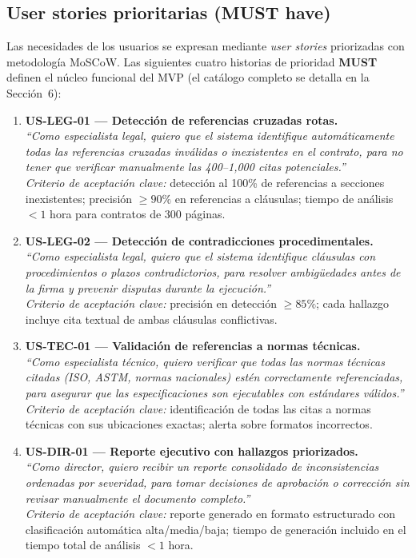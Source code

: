\subsection{User stories prioritarias (MUST have)}

Las necesidades de los usuarios se expresan mediante \textit{user stories}
priorizadas con metodología MoSCoW. Las siguientes cuatro historias de prioridad
\textbf{MUST} definen el núcleo funcional del MVP (el catálogo completo se
detalla en la Sección~6):

\begin{enumerate}
    \item \textbf{US-LEG-01 — Detección de referencias cruzadas rotas.}\\
    \textit{``Como especialista legal, quiero que el sistema identifique
    automáticamente todas las referencias cruzadas inválidas o inexistentes en el
    contrato, para no tener que verificar manualmente las 400--1{,}000 citas
    potenciales.''}\\
    \textit{Criterio de aceptación clave:} detección al 100\% de referencias a
    secciones inexistentes; precisión $\geq 90\%$ en referencias a cláusulas;
    tiempo de análisis $< 1$ hora para contratos de 300 páginas.

    \item \textbf{US-LEG-02 — Detección de contradicciones procedimentales.}\\
    \textit{``Como especialista legal, quiero que el sistema identifique cláusulas
    con procedimientos o plazos contradictorios, para resolver ambigüedades antes
    de la firma y prevenir disputas durante la ejecución.''}\\
    \textit{Criterio de aceptación clave:} precisión en detección $\geq 85\%$;
    cada hallazgo incluye cita textual de ambas cláusulas conflictivas.

    \item \textbf{US-TEC-01 — Validación de referencias a normas técnicas.}\\
    \textit{``Como especialista técnico, quiero verificar que todas las normas
    técnicas citadas (ISO, ASTM, normas nacionales) estén correctamente
    referenciadas, para asegurar que las especificaciones son ejecutables con
    estándares válidos.''}\\
    \textit{Criterio de aceptación clave:} identificación de todas las citas a
    normas técnicas con sus ubicaciones exactas; alerta sobre formatos incorrectos.

    \item \textbf{US-DIR-01 — Reporte ejecutivo con hallazgos priorizados.}\\
    \textit{``Como director, quiero recibir un reporte consolidado de inconsistencias
    ordenadas por severidad, para tomar decisiones de aprobación o corrección sin
    revisar manualmente el documento completo.''}\\
    \textit{Criterio de aceptación clave:} reporte generado en formato estructurado
    con clasificación automática alta/media/baja; tiempo de generación incluido en
    el tiempo total de análisis $< 1$ hora.
\end{enumerate}